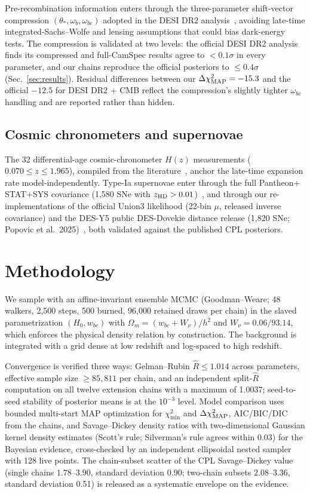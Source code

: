 \documentclass[aps,prd,twocolumn,superscriptaddress,nofootinbib]{revtex4-2}
\begin{document}
Pre-recombination information enters through the three-parameter shift-vector compression $(\theta_*, \omega_b, \omega_{bc})$ adopted in the DESI DR2 analysis~\cite{DESI2025}, avoiding late-time integrated-Sachs--Wolfe and lensing assumptions that could bias dark-energy tests. The compression is validated at two levels: the official DESI DR2 analysis finds its compressed and full-CamSpec results agree to $<0.1\sigma$ in every parameter, and our chains reproduce the official posteriors to $\le 0.4\sigma$ (Sec.~\ref{sec:results}). Residual differences between our $\Delta\chi^2_{\rm MAP} = -15.3$ and the official $-12.5$ for DESI DR2 + CMB reflect the compression's slightly tighter $\omega_{bc}$ handling and are reported rather than hidden.

\subsection{Cosmic chronometers and supernovae}

The 32 differential-age cosmic-chronometer $H(z)$ measurements ($0.070 \le z \le 1.965$), compiled from the literature~\cite{Carloni2026}, anchor the late-time expansion rate model-independently. Type-Ia supernovae enter through the full Pantheon+ STAT+SYS covariance (1{,}580 SNe with $z_{\rm HD} > 0.01$)~\cite{Brout2022,Scolnic2022}, and through our re-implementations of the official Union3 likelihood (22-bin $\mu$, released inverse covariance) and the DES-Y5 public DES-Dovekie distance release (1{,}820 SNe; Popovic et al.~2025)~\cite{Popovic2025}, both validated against the published CPL posteriors.

\section{Methodology}
\label{sec:method}

We sample with an affine-invariant ensemble MCMC (Goodman--Weare; 48 walkers, 2{,}500 steps, 500 burned, 96{,}000 retained draws per chain) in the slaved parametrization $(H_0, w_{bc})$ with $\Omega_m = (w_{bc} + W_\nu)/h^2$ and $W_\nu = 0.06/93.14$, which enforces the physical density relation by construction. The background is integrated with a grid dense at low redshift and log-spaced to high redshift.

Convergence is verified three ways: Gelman--Rubin $\widehat{R} \le 1.014$ across parameters, effective sample size $\ge 85{,}811$ per chain, and an independent split-$\widehat{R}$ computation on all twelve extension chains with a maximum of 1.0037; seed-to-seed stability of posterior means is at the $10^{-3}$ level. Model comparison uses bounded multi-start MAP optimization for $\chi^2_{\min}$ and $\Delta\chi^2_{\rm MAP}$, AIC/BIC/DIC from the chains, and Savage--Dickey density ratios with two-dimensional Gaussian kernel density estimates (Scott's rule; Silverman's rule agrees within 0.03) for the Bayesian evidence, cross-checked by an independent ellipsoidal nested sampler with 128 live points. The chain-subset scatter of the CPL Savage--Dickey value (single chains $1.78$--$3.90$, standard deviation 0.90; two-chain subsets $2.08$--$3.36$, standard deviation 0.51) is released as a systematic envelope on the evidence.
\end{document}
